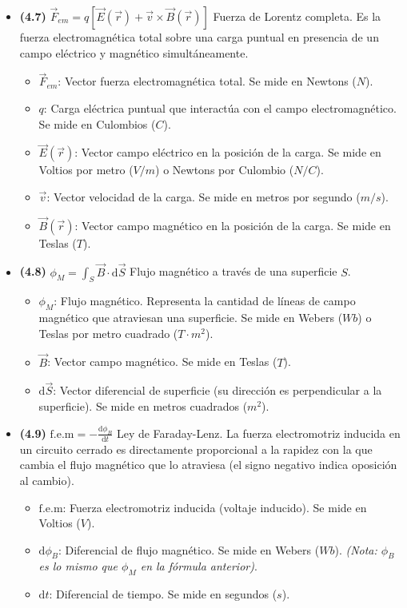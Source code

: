 \documentclass{article}
\begin{document}
\begin{itemize}
				\item \textbf{(4.7)} $\boxed{\vec{F}_{em} = q\left[\vec{E}(\vec{r}) + \vec{v} \times \vec{B}(\vec{r})\right]}$ Fuerza de Lorentz completa. Es la fuerza electromagnética total sobre una carga puntual en presencia de un campo eléctrico y magnético simultáneamente.
					\begin{itemize}
						\item $\vec{F}_{em}$: Vector fuerza electromagnética total. Se mide en Newtons ($N$).
						\item $q$: Carga eléctrica puntual que interactúa con el campo electromagnético. Se mide en Culombios ($C$).
						\item $\vec{E}(\vec{r})$: Vector campo eléctrico en la posición de la carga. Se mide en Voltios por metro ($V/m$) o Newtons por Culombio ($N/C$).
						\item $\vec{v}$: Vector velocidad de la carga. Se mide en metros por segundo ($m/s$).
						\item $\vec{B}(\vec{r})$: Vector campo magnético en la posición de la carga. Se mide en Teslas ($T$).
					\end{itemize}

				\item \textbf{(4.8)} $\boxed{\phi_M = \int_S \vec{B} \cdot \mathrm{d}\vec{S}}$ Flujo magnético a través de una superficie $S$.
					\begin{itemize}
						\item $\phi_M$: Flujo magnético. Representa la cantidad de líneas de campo magnético que atraviesan una superficie. Se mide en Webers ($Wb$) o Teslas por metro cuadrado ($T\cdot m^2$).
						\item $\vec{B}$: Vector campo magnético. Se mide en Teslas ($T$).
						\item $\mathrm{d}\vec{S}$: Vector diferencial de superficie (su dirección es perpendicular a la superficie). Se mide en metros cuadrados ($m^2$).
					\end{itemize}

				\item \textbf{(4.9)} $\boxed{\text{f.e.m} = -\frac{\mathrm{d}\phi_B}{\mathrm{d}t}}$ Ley de Faraday-Lenz. La fuerza electromotriz inducida en un circuito cerrado es directamente proporcional a la rapidez con la que cambia el flujo magnético que lo atraviesa (el signo negativo indica oposición al cambio).
					\begin{itemize}
						\item $\text{f.e.m}$: Fuerza electromotriz inducida (voltaje inducido). Se mide en Voltios ($V$).
						\item $\mathrm{d}\phi_B$: Diferencial de flujo magnético. Se mide en Webers ($Wb$). \textit{(Nota: $\phi_B$ es lo mismo que $\phi_M$ en la fórmula anterior)}.
						\item $\mathrm{d}t$: Diferencial de tiempo. Se mide en segundos ($s$).
					\end{itemize}


\end{itemize}
\end{document}
